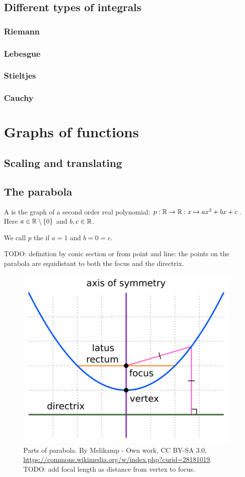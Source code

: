 \subsection{Different types of integrals}
\subsubsection{Riemann}
\subsubsection{Lebesgue}
\subsubsection{Stieltjes}
\subsubsection{Cauchy}


\section{Graphs of functions}
\subsection{Scaling and translating}

\subsection{The parabola}
\begin{definition}
A  is the graph of a second order real polynomial: $p:\mathbb{R}\to \mathbb{R}: x\mapsto ax^2 + bx +c$.
Here $a\in\mathbb{R}\setminus\{0\}$ and $b,c\in \mathbb{R}$.

We call $p$ the  if $a = 1$ and $b= 0 =c$.
\end{definition}
TODO: definition by conic section or from point and line: the points on the parabola are equidistant to both the focus and the directrix.

\begin{figure}[h!]
\centering
\includegraphics[width=.8\textwidth]{Parts_of_Parabola}
\caption{Parts of parabola. By Melikamp - Own work, CC BY-SA 3.0, \url{https://commons.wikimedia.org/w/index.php?curid=28181019}. TODO: add focal length as distance from vertex to focus.}
\end{figure}

